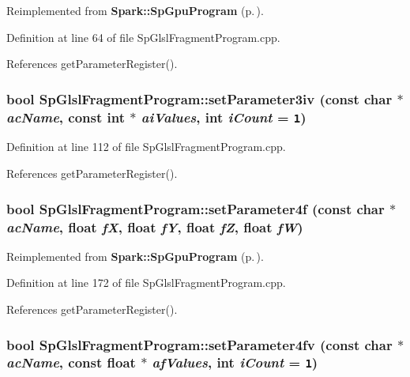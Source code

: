 Reimplemented from {\bf Spark::Sp\-Gpu\-Program} {\rm (p.\,\pageref{classSpark_1_1SpGpuProgram_a14})}.

Definition at line 64 of file Sp\-Glsl\-Fragment\-Program.cpp.

References get\-Parameter\-Register().
\subsubsection{\setlength{\rightskip}{0pt plus 5cm}bool Sp\-Glsl\-Fragment\-Program::set\-Parameter3iv (const char $\ast$ {\em ac\-Name}, const int $\ast$ {\em ai\-Values}, int {\em i\-Count} = {\tt 1})\hspace{0.3cm}{\tt  [virtual]}}\label{classSpark_1_1SpGlslFragmentProgram_a7}


Definition at line 112 of file Sp\-Glsl\-Fragment\-Program.cpp.

References get\-Parameter\-Register().
\subsubsection{\setlength{\rightskip}{0pt plus 5cm}bool Sp\-Glsl\-Fragment\-Program::set\-Parameter4f (const char $\ast$ {\em ac\-Name}, float {\em f\-X}, float {\em f\-Y}, float {\em f\-Z}, float {\em f\-W})\hspace{0.3cm}{\tt  [virtual]}}\label{classSpark_1_1SpGlslFragmentProgram_a12}




Reimplemented from {\bf Spark::Sp\-Gpu\-Program} {\rm (p.\,\pageref{classSpark_1_1SpGpuProgram_a23})}.

Definition at line 172 of file Sp\-Glsl\-Fragment\-Program.cpp.

References get\-Parameter\-Register().
\subsubsection{\setlength{\rightskip}{0pt plus 5cm}bool Sp\-Glsl\-Fragment\-Program::set\-Parameter4fv (const char $\ast$ {\em ac\-Name}, const float $\ast$ {\em af\-Values}, int {\em i\-Count} = {\tt 1})\hspace{0.3cm}{\tt  [virtual]}}\label{classSpark_1_1SpGlslFragmentProgram_a16}




